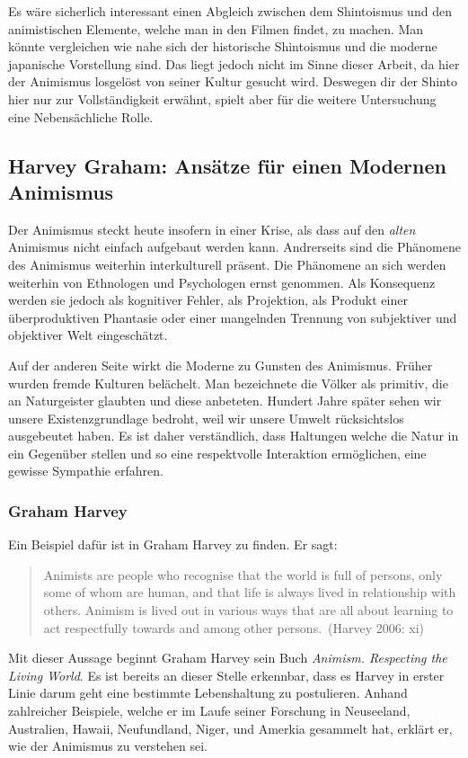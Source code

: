 Es wäre sicherlich interessant einen Abgleich zwischen dem Shintoismus und den animistischen Elemente, welche man in den Filmen findet, zu machen. Man könnte vergleichen wie nahe sich der historische Shintoismus und die moderne japanische Vorstellung sind. Das liegt jedoch nicht im Sinne dieser Arbeit, da hier der Animismus losgelöst von seiner Kultur gesucht wird. Deswegen dir der Shinto hier nur zur Vollständigkeit erwähnt, spielt aber für die weitere Untersuchung eine Nebensächliche Rolle.

\subsection{Harvey Graham: Ansätze für einen Modernen Animismus}
Der Animismus steckt heute insofern in einer Krise, als dass auf den \emph{alten} Animismus nicht einfach aufgebaut werden kann. Andrerseits sind die Phänomene des Animismus weiterhin interkulturell präsent. Die Phänomene an sich werden weiterhin von Ethnologen und Psychologen ernst genommen. Als Konsequenz werden sie jedoch als kognitiver Fehler, als Projektion, als Produkt einer überproduktiven Phantasie oder einer mangelnden Trennung von subjektiver und objektiver Welt eingeschätzt. 

Auf der anderen Seite wirkt die Moderne zu Gunsten des Animismus. Früher wurden fremde Kulturen belächelt. Man bezeichnete die Völker als primitiv, die an Naturgeister glaubten und diese anbeteten. Hundert Jahre später sehen wir unsere Existenzgrundlage bedroht, weil wir unsere Umwelt rücksichtslos ausgebeutet haben. Es ist daher verständlich, dass Haltungen welche die Natur in ein Gegenüber stellen und so eine respektvolle Interaktion ermöglichen, eine gewisse Sympathie erfahren. 

\subsubsection*{Graham Harvey}
Ein Beispiel dafür ist in Graham Harvey zu finden. Er sagt: 

\begin{quote}
	\glqq Animists are people who recognise that the world is full of persons, only some of whom are human, and that life is always lived in relationship with others. Animism is lived out in various ways that are all about learning to act respectfully towards and among other persons.\grqq ~(Harvey 2006: xi)
\end{quote}

Mit dieser Aussage beginnt Graham Harvey sein Buch \emph{Animism. Respecting the Living World}. Es ist bereits an dieser Stelle erkennbar, dass es Harvey in erster Linie darum geht eine bestimmte Lebenshaltung zu postulieren. Anhand zahlreicher Beispiele, welche er im Laufe seiner Forschung in Neuseeland, Australien, Hawaii, Neufundland, Niger, und Amerkia gesammelt hat, erklärt er, wie der Animismus zu verstehen sei. 

